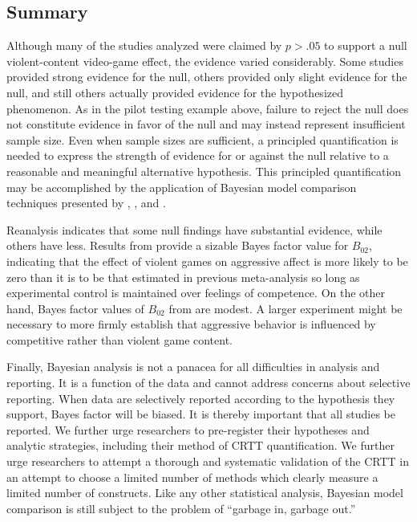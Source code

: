 \documentclass[man]{apa6}
\begin{document}
\subsection{Summary}
Although many of the studies analyzed were claimed by $p>.05$ to support a null violent-content video-game effect, the evidence varied considerably.  Some studies provided strong evidence for the null, others provided only slight evidence for the null, and still others actually provided evidence for 
the hypothesized phenomenon. As in the pilot testing example above, failure to reject the null does not constitute evidence in favor of the null and may instead represent insufficient sample size. Even when sample sizes are sufficient, a principled quantification is needed to express the strength of evidence for or against the null relative to a reasonable and meaningful alternative hypothesis. This principled quantification may be accomplished by the application of Bayesian model comparison techniques presented by \citet{Rouder:Morey:2012}, \citet{Rouder:etal:2012}, and \citet{Dienes:2011, Dienes:2014}. 

Reanalysis indicates that some null findings have substantial evidence, while others have less. Results from \citet{Przybylski:etal:2014} provide a sizable Bayes factor value for $B_{02}$, indicating that the effect of violent games on aggressive affect is more likely to be zero than it is to be that estimated in previous meta-analysis so long as experimental control is maintained over feelings of competence. On the other hand, Bayes factor values of $B_{02}$ from \citet{Adachi:Willoughby:2011} are modest.  A larger experiment might be necessary to more firmly establish that aggressive behavior is influenced by competitive rather than violent game content.

Finally, Bayesian analysis is not a panacea for all difficulties in analysis and reporting.  It is a function of the data and cannot address concerns about selective reporting.  When data are selectively reported according to the hypothesis they support, Bayes factor will be biased. It is thereby important that all studies be reported. We further urge researchers to pre-register their hypotheses and analytic strategies, including their method of CRTT quantification. We further urge researchers to attempt a thorough and systematic validation of the CRTT in an attempt to choose a limited number of methods which clearly measure a limited number of constructs. Like any other statistical analysis, Bayesian model comparison is still subject to the problem of ``garbage in, garbage out.''
\end{document}
